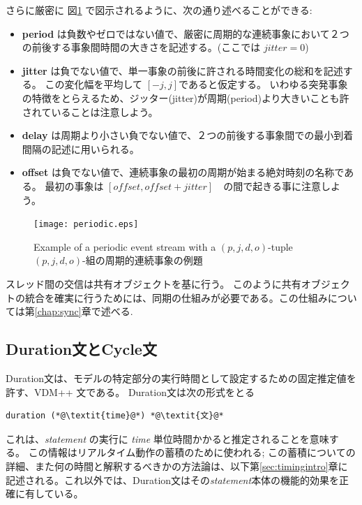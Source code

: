 \documentclass[\pformat,12pt]{jreport}
\begin{document}
さらに厳密に 図\ref{fig:perioddef} で図示されるように、次の通り述べることができる:
\begin{itemize}
\item \textbf{period} は負数やゼロではない値で、厳密に周期的な連続事象において２つの前後する事象間時間の大きさを記述する。(ここでは $jitter=0$)
\item \textbf{jitter} は負でない値で、単一事象の前後に許される時間変化の総和を記述する。
この変化幅を平均して $[-j,j]$であると仮定する。
いわゆる突発事象の特徴をとらえるため、ジッター(jitter)が周期(period)より大きいことも許されていることは注意しよう。
\item \textbf{delay} は周期より小さい負でない値で、２つの前後する事象間での最小到着間隔の記述に用いられる。
\item \textbf{offset} は負でない値で、連続事象の最初の周期が始まる絶対時刻の名称である。
最初の事象は $[offset,offset + jitter]$　の間で起きる事に注意しよう。
\end{itemize}

\begin{figure}[!htb]
\begin{center}
\texttt{[image: periodic.eps]}
\end{center}
\caption{Example of a periodic event stream with a $(p,j,d,o)$-tuple  $(p,j,d,o)$-組の周期的連続事象の例題\label{fig:perioddef}}
\end{figure}

スレッド間の交信は共有オブジェクトを基に行う。
このように共有オブジェクトの統合を確実に行うためには、同期の仕組みが必要である。この仕組みについては第\ref{chap:sync}章で述べる.

\subsection{Duration文とCycle文}

Duration文は、モデルの特定部分の実行時間として設定するための固定推定値を許す、VDM++ 文である。
Duration文は次の形式をとる

\begin{lstlisting}
duration (*@\textit{time}@*) *@\textit{文}@*
\end{lstlisting}

これは、\emph{statement} の実行に \emph{time} 単位時間かかると推定されることを意味する。
この情報はリアルタイム動作の蓄積のために使われる; この蓄積についての詳細、また何の時間と解釈するべきかの方法論は、以下第\ref{sec:timingintro}章に記述される。これ以外では、Duration文はその\textit{statement}本体の機能的効果を正確に有している。
\end{document}

